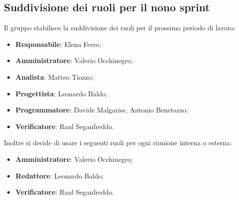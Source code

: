 \documentclass[italian,12pt]{article}
\begin{document}
\subsection{Suddivisione dei ruoli per il nono sprint}
Il gruppo stabilisce la suddivisione dei ruoli per il prossimo periodo di lavoro:
\begin{itemize}
	\item \textbf{Responsabile}: Elena Ferro;
	\item \textbf{Amministratore}: Valerio Occhinegro;
	\item \textbf{Analista}: Matteo Tiozzo;
	\item \textbf{Progettista}: Leonardo Baldo;
	\item \textbf{Programmatore}: Davide Malgarise, Antonio Benetazzo;
	\item \textbf{Verificatore}: Raul Seganfreddo.
\end{itemize}
Inoltre si decide di usare i seguenti ruoli per ogni riunione interna o esterna:
\begin{itemize}
	\item \textbf{Amministratore}: Valerio Occhinegro;
	\item \textbf{Redattore}: Leonardo Baldo;
	\item \textbf{Verificatore}: Raul Seganfreddo.
\end{itemize}
\end{document}
